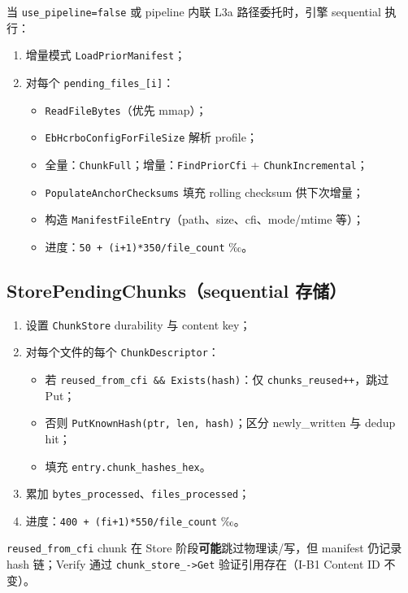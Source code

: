 当 \texttt{use\_pipeline=false} 或 pipeline 内联 L3a 路径委托时，引擎 sequential 执行：

\begin{enumerate}[nosep]
  \item 增量模式 \texttt{LoadPriorManifest}；
  \item 对每个 \texttt{pending\_files\_[i]}：
  \begin{itemize}[nosep]
    \item \texttt{ReadFileBytes}（优先 mmap）；
    \item \texttt{EbHcrboConfigForFileSize} 解析 profile；
    \item 全量：\texttt{ChunkFull}；增量：\texttt{FindPriorCfi} + \texttt{ChunkIncremental}；
    \item \texttt{PopulateAnchorChecksums} 填充 rolling checksum 供下次增量；
    \item 构造 \texttt{ManifestFileEntry}（path、size、cfi、mode/mtime 等）；
    \item 进度：\texttt{50 + (i+1)*350/file\_count} ‰。
  \end{itemize}
\end{enumerate}

\subsection{StorePendingChunks（sequential 存储）}

\begin{enumerate}[nosep]
  \item 设置 \texttt{ChunkStore} durability 与 content key；
  \item 对每个文件的每个 \texttt{ChunkDescriptor}：
  \begin{itemize}[nosep]
    \item 若 \texttt{reused\_from\_cfi \&\& Exists(hash)}：仅 \texttt{chunks\_reused++}，跳过 Put；
    \item 否则 \texttt{PutKnownHash(ptr, len, hash)}；区分 newly\_written 与 dedup hit；
    \item 填充 \texttt{entry.chunk\_hashes\_hex}。
  \end{itemize}
  \item 累加 \texttt{bytes\_processed}、\texttt{files\_processed}；
  \item 进度：\texttt{400 + (fi+1)*550/file\_count} ‰。
\end{enumerate}

\begin{invariantbox}
\texttt{reused\_from\_cfi} chunk 在 Store 阶段\textbf{可能}跳过物理读/写，但 manifest 仍记录 hash 链；Verify 通过 \texttt{chunk\_store\_->Get} 验证引用存在（I-B1 Content ID 不变）。
\end{invariantbox}

